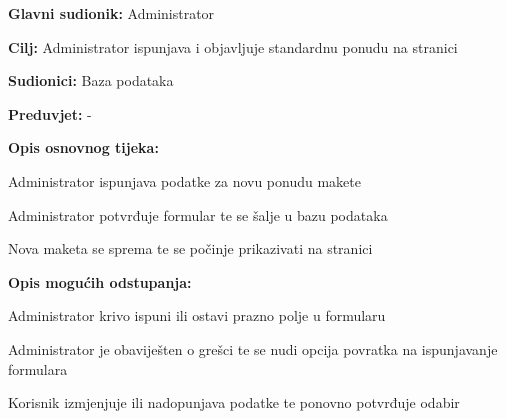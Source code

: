 				\noindent {}
				\begin{packed_item}
					
					\item \textbf{Glavni sudionik: }Administrator
					\item  \textbf{Cilj:} Administrator ispunjava i objavljuje standardnu ponudu na stranici
					\item  \textbf{Sudionici:} Baza podataka
					\item  \textbf{Preduvjet:} -
					\item  \textbf{Opis osnovnog tijeka:}
					
					\item[] \begin{packed_enum}
						
						\item Administrator ispunjava podatke za novu ponudu makete
						\item Administrator potvrđuje formular te se šalje u bazu podataka
						\item Nova maketa se sprema te se počinje prikazivati na stranici
					\end{packed_enum}

					\item  \textbf{Opis mogućih odstupanja:}
					
					\item[] \begin{packed_item}
 
						\item[2.a] Administrator krivo ispuni ili ostavi prazno polje u formularu
						\item[] \begin{packed_enum}
							
							\item Administrator je obaviješten o grešci te se nudi opcija povratka na ispunjavanje formulara
							\item Korisnik izmjenjuje ili nadopunjava podatke te ponovno potvrđuje odabir
							
						\end{packed_enum}	
					\end{packed_item}
				\end{packed_item}
			
